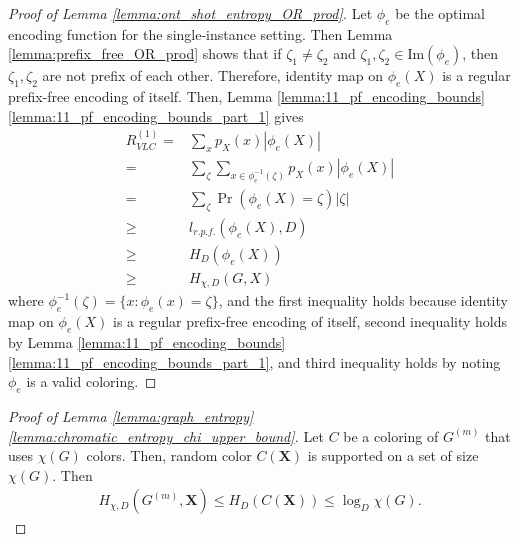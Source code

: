 \documentclass[journal, onecolumn, draftcls]{IEEEtran}
\theoremstyle{definition}
\newcommand{\bfX}{\mathbf{X}}
\newcommand{\bfx}{\mathbf{x}}
\newcommand{\meng}[1]{\marginpar{+}{\bf Ruoyu's remark}: {\em #1}}
\newcommand{\aditya}[1]{\marginpar{+}{\bf Aditya's remark}: {\em #1}}
\begin{document}
\begin{proof}[Proof of Lemma \ref{lemma:ont_shot_entropy_OR_prod}]
Let $\phi_e$ be the optimal encoding function for the single-instance setting. Then Lemma \ref{lemma:prefix_free_OR_prod} shows that if $\zeta_1\ne \zeta_2$ and $\zeta_1,\zeta_2\in \text{Im}(\phi_e)$, then $\zeta_1,\zeta_2$ are not prefix of each other. Therefore, identity map on $\phi_e(X)$ is a regular prefix-free encoding of itself.   Then, Lemma \ref{lemma:11_pf_encoding_bounds} \ref{lemma:11_pf_encoding_bounds_part_1} gives
 \begin{align*}  
   R_{VLC}^{(1)}=&\sum_xp_X(x) |\phi_e(X)|\\
   =&\sum_\zeta \sum_{x\in \phi_e^{-1}(\zeta)}p_X(x) |\phi_e(X)| \\
   = &   \sum_\zeta\Pr({\phi_e(X)}=\zeta) |\zeta| \\
   \ge&    l_{r.p.f.}(\phi_e(X),D)\\
   \ge& H_D(\phi_e(X))\\
   \ge&  H_{\chi,D} (G,X)
 \end{align*}
where $\phi_e^{-1}(\zeta)=\{x: \phi_e(x)=\zeta\}$, and the first inequality holds because identity map on $\phi_e(X)$ is a regular prefix-free encoding of itself, second inequality holds by Lemma \ref{lemma:11_pf_encoding_bounds} \ref{lemma:11_pf_encoding_bounds_part_1}, and third inequality holds by noting $\phi_e$ is a valid coloring. %
\end{proof}


\begin{proof}[Proof of  Lemma \ref{lemma:graph_entropy}    \ref{lemma:chromatic_entropy_chi_upper_bound}]
    Let $C$ be a coloring of $G^{(m)}$ that uses $\chi(G)$ colors.  Then, random color $C(\bfX)$ is supported on a set of size $\chi(G)$. Then
    \begin{align*}
       H_{\chi,D}(G^{(m)},\bfX) \le H_D(C(\bfX))\le \log_D\chi(G).
    \end{align*}
\end{proof}

\end{document}
